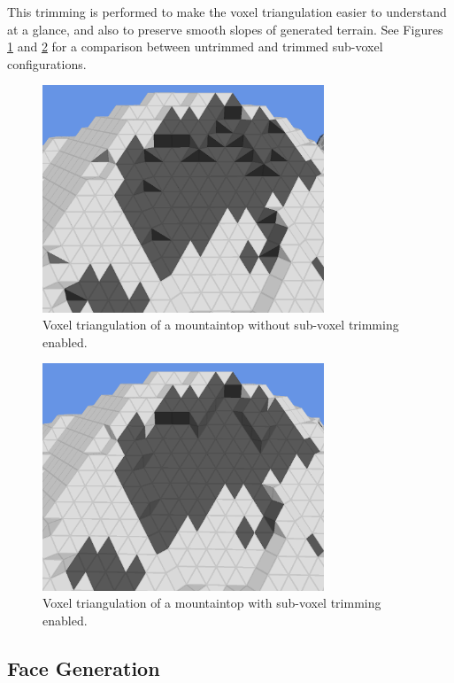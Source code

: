 This trimming is performed to make the voxel triangulation easier to understand at a glance, and also to preserve smooth slopes of generated terrain.
See Figures \ref{fig:trimcomparison1} and \ref{fig:trimcomparison2} for a comparison between untrimmed and trimmed sub-voxel configurations.

\begin{figure}
	\centering
		\includegraphics[width=0.75\textwidth]{figures/trimcomparison1.png}
	\caption{
		Voxel triangulation of a mountaintop without sub-voxel trimming enabled.
	}
	\label{fig:trimcomparison1}
\end{figure}

\begin{figure}
	\centering
		\includegraphics[width=0.75\textwidth]{figures/trimcomparison2.png}
	\caption{
		Voxel triangulation of a mountaintop with sub-voxel trimming enabled.
	}
	\label{fig:trimcomparison2}
\end{figure}

\subsection{Face Generation}

